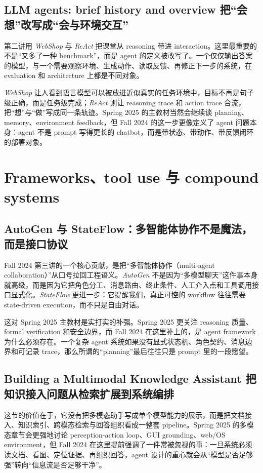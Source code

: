 \subsection{LLM agents: brief history and overview 把“会想”改写成“会与环境交互”}

第二讲用 \textit{WebShop} 与 \textit{ReAct} 把课堂从 reasoning 带进 interaction。这里最重要的不是“又多了一种 benchmark”，而是 agent 的定义被改写了。一个仅仅输出答案的模型，与一个需要观察环境、生成动作、读取反馈、再修正下一步的系统，在 evaluation 和 architecture 上都是不同对象。

\textit{WebShop} 让人看到语言模型可以被放进近似真实的任务环境中，目标不再是句子级正确，而是任务级完成；\textit{ReAct} 则让 reasoning trace 和 action trace 合流，把“想”与“做”写成同一条轨迹。Spring 2025 的主教材当然会继续谈 planning、memory、environment feedback，但 Fall 2024 的这一步更像定义了 agent 问题本身：agent 不是 prompt 写得更长的 chatbot，而是带状态、带动作、带反馈闭环的部署对象。

\section{Frameworks、tool use 与 compound systems}

\subsection{AutoGen 与 StateFlow：多智能体协作不是魔法，而是接口协议}

Fall 2024 第三讲的一个核心贡献，是把“多智能体协作（multi-agent collaboration）”从口号拉回工程语义。\textit{AutoGen} 不是因为“多模型聊天”这件事本身就高级，而是因为它把角色分工、消息路由、终止条件、人工介入点和工具调用接口显式化。\textit{StateFlow} 更进一步：它提醒我们，真正可控的 workflow 往往需要 state-driven execution，而不只是自由对话。

这对 Spring 2025 主教材是实打实的补强。Spring 2025 更关注 reasoning 质量、formal verification 和安全边界，而 Fall 2024 在这里补上的，是 agent framework 为什么必须存在。一个复杂 agent 系统如果没有显式状态机、角色契约、消息边界和可记录 trace，那么所谓的“planning”最后往往只是 prompt 里的一段愿望。

\subsection{Building a Multimodal Knowledge Assistant 把知识接入问题从检索扩展到系统编排}

这节的价值在于，它没有把多模态助手写成单个模型能力的展示，而是把文档接入、知识索引、跨模态检索与回答组织看成一整套 pipeline。Spring 2025 的多模态章节会更强地讨论 perception-action loop、GUI grounding、web/OS environment，但 Fall 2024 在这里提前强调了一件常被忽视的事：一旦系统必须读文档、看图、定位证据、再组织回答，agent 设计的重心就会从“模型是否足够强”转向“信息流是否足够干净”。

